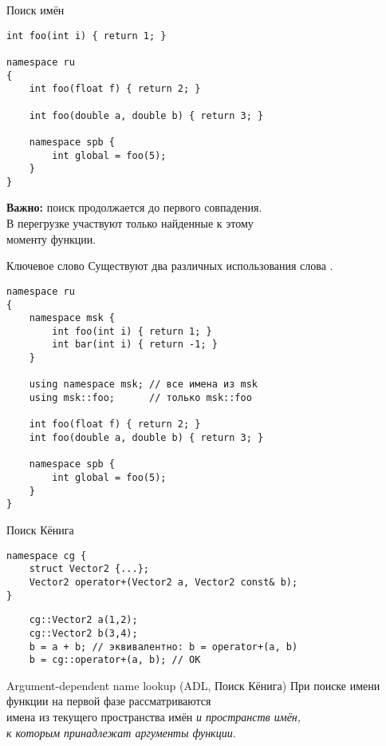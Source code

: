 \documentclass[aspectration=1610,t]{beamer}
\begin{document}
\begin{frame}[fragile]{Поиск имён}
    \begin{lstlisting}
int foo(int i) { return 1; } 

namespace ru 
{
    int foo(float f) { return 2; }

    int foo(double a, double b) { return 3; }

    namespace spb {
        int global = foo(5);
    }
}                          
    \end{lstlisting}
    \medskip\textbf{Важно:} поиск продолжается до первого совпадения.\\
    В перегрузке участвуют только найденные к этому \\моменту функции.
\end{frame}

\begin{frame}[fragile]{Ключевое слово }
Существуют два различных использования слова .
    \begin{lstlisting}
namespace ru 
{
    namespace msk {
        int foo(int i) { return 1; }
        int bar(int i) { return -1; }
    }

    using namespace msk; // все имена из msk
    using msk::foo;      // только msk::foo
    
    int foo(float f) { return 2; }
    int foo(double a, double b) { return 3; }
    
    namespace spb {
        int global = foo(5);
    }
}                          
    \end{lstlisting}
\end{frame}

\begin{frame}[fragile]{Поиск Кёнига}{}
    \begin{lstlisting}
namespace cg {
    struct Vector2 {...};
    Vector2 operator+(Vector2 a, Vector2 const& b);
}
    \end{lstlisting}\pause
    \begin{lstlisting}
    cg::Vector2 a(1,2);
    cg::Vector2 b(3,4);
    b = a + b; // эквивалентно: b = operator+(a, b)
    b = cg::operator+(a, b); // OK
    \end{lstlisting}
\pause\medskip
\begin{block}{Argument-dependent name lookup (ADL, Поиск Кёнига)}
При поиске имени функции на первой фазе рассматриваются\\ имена из 
текущего пространства имён {\em и пространств имён,\\ к которым 
принадлежат аргументы функции}.
\end{block}
\end{frame}
\end{document}
